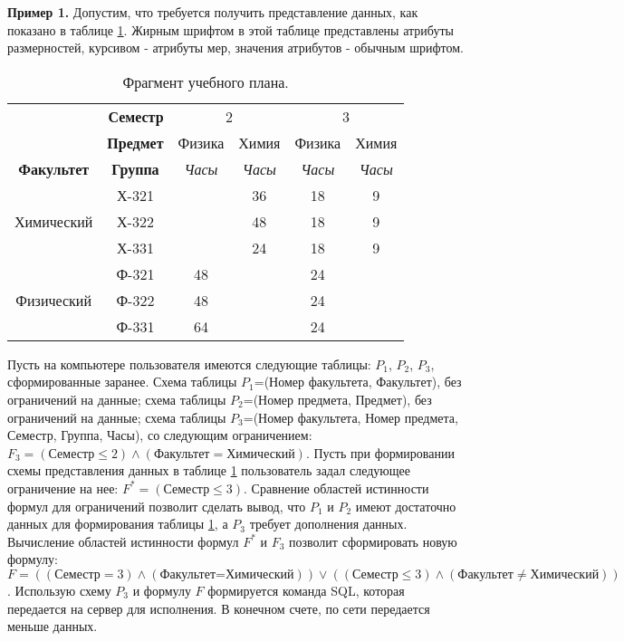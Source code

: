 \documentclass[10pt,a4paper]{article}
\begin{document}
{\bf Пример 1.} Допустим, что требуется получить представление данных, как показано в
таблице \ref{def_T_1}. Жирным шрифтом в этой таблице представлены атрибуты размерностей,
курсивом - атрибуты мер, значения атрибутов - обычным шрифтом.

\begin{table}[h!]
\caption{\label{def_T_1} Фрагмент учебного плана.}
\begin{center}
\begin{tabular}{|c|c||c|c|c|c|}
\cline{2-6}
\multicolumn{1}{c|}{} & \multicolumn{1}{|r||}{\bf Семестр} & \multicolumn{2}{|c|}{2} & \multicolumn{2}{|c|}{3}  \\
\cline{2-6}
\multicolumn{1}{c|}{} & {\bf Предмет} & Физика & Химия & Физика & Химия \\
\hline \cline{2-6}
{\bf Факультет} & {\bf Группа} & {\it Часы} & {\it Часы} & {\it Часы} & {\it Часы} \\
\hline
 & Х-321 & & 36 & 18 & 9 \\
\cline{2-6}
Химический & Х-322 & & 48 & 18 & 9 \\
\cline{2-6}
 & Х-331 & & 24 & 18 & 9 \\
\hline
 & Ф-321 & 48 & & 24 & \\
\cline{2-6}
Физический & Ф-322 & 48 & & 24 & \\
\cline{2-6}
 & Ф-331 & 64 & & 24 & \\
\hline
\end{tabular}
\end{center}
\end{table}
Пусть на компьютере пользователя имеются следующие таблицы: $P_1$,
$P_2$, $P_3$, сформированные заранее. Схема таблицы $P_1$=(Номер факультета, Факультет), без ограничений на данные;
схема таблицы $P_2$=(Номер предмета, Предмет), без ограничений на данные;
схема таблицы $P_3$=(Номер факультета, Номер предмета, Семестр, Группа, Часы), со следующим ограничением:
$F_3 =(\mbox{Семестр} \leq 2) \wedge (\mbox{Факультет} = \mbox{Химический})$.
Пусть при формировании схемы представления данных в таблице \ref{def_T_1} пользователь задал следующее
ограничение на нее: $F^{\ast} = (\mbox{Семестр} \leq 3)$.
Сравнение областей истинности формул для ограничений позволит сделать вывод, что $P_1$ и $P_2$ имеют
достаточно данных для формирования таблицы \ref{def_T_1}, а $P_3$ требует дополнения данных.
Вычисление областей истинности формул $F^{\ast}$ и $F_3$ позволит сформировать новую формулу:
$F=((\mbox{Семестр} = 3) \wedge (\mbox{Факультет=Химический}))
\vee ((\mbox{Семестр} \leq 3) \wedge (\mbox{Факультет} \neq \mbox{Химический}))$. Использую схему $P_3$ и
формулу $F$ формируется команда SQL, которая передается на сервер для исполнения. В конечном счете,
по сети передается меньше данных.
\end{document}
